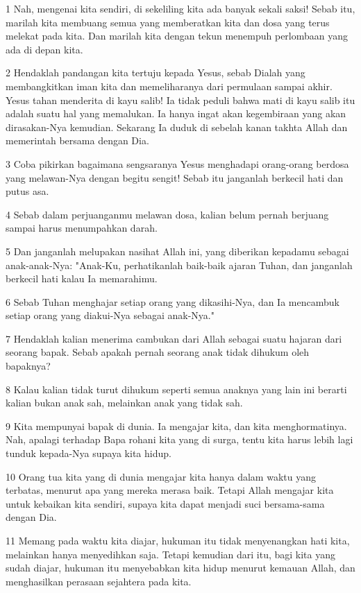 \par 1 Nah, mengenai kita sendiri, di sekeliling kita ada banyak sekali saksi! Sebab itu, marilah kita membuang semua yang memberatkan kita dan dosa yang terus melekat pada kita. Dan marilah kita dengan tekun menempuh perlombaan yang ada di depan kita.
\par 2 Hendaklah pandangan kita tertuju kepada Yesus, sebab Dialah yang membangkitkan iman kita dan memeliharanya dari permulaan sampai akhir. Yesus tahan menderita di kayu salib! Ia tidak peduli bahwa mati di kayu salib itu adalah suatu hal yang memalukan. Ia hanya ingat akan kegembiraan yang akan dirasakan-Nya kemudian. Sekarang Ia duduk di sebelah kanan takhta Allah dan memerintah bersama dengan Dia.
\par 3 Coba pikirkan bagaimana sengsaranya Yesus menghadapi orang-orang berdosa yang melawan-Nya dengan begitu sengit! Sebab itu janganlah berkecil hati dan putus asa.
\par 4 Sebab dalam perjuanganmu melawan dosa, kalian belum pernah berjuang sampai harus menumpahkan darah.
\par 5 Dan janganlah melupakan nasihat Allah ini, yang diberikan kepadamu sebagai anak-anak-Nya: "Anak-Ku, perhatikanlah baik-baik ajaran Tuhan, dan janganlah berkecil hati kalau Ia memarahimu.
\par 6 Sebab Tuhan menghajar setiap orang yang dikasihi-Nya, dan Ia mencambuk setiap orang yang diakui-Nya sebagai anak-Nya."
\par 7 Hendaklah kalian menerima cambukan dari Allah sebagai suatu hajaran dari seorang bapak. Sebab apakah pernah seorang anak tidak dihukum oleh bapaknya?
\par 8 Kalau kalian tidak turut dihukum seperti semua anaknya yang lain ini berarti kalian bukan anak sah, melainkan anak yang tidak sah.
\par 9 Kita mempunyai bapak di dunia. Ia mengajar kita, dan kita menghormatinya. Nah, apalagi terhadap Bapa rohani kita yang di surga, tentu kita harus lebih lagi tunduk kepada-Nya supaya kita hidup.
\par 10 Orang tua kita yang di dunia mengajar kita hanya dalam waktu yang terbatas, menurut apa yang mereka merasa baik. Tetapi Allah mengajar kita untuk kebaikan kita sendiri, supaya kita dapat menjadi suci bersama-sama dengan Dia.
\par 11 Memang pada waktu kita diajar, hukuman itu tidak menyenangkan hati kita, melainkan hanya menyedihkan saja. Tetapi kemudian dari itu, bagi kita yang sudah diajar, hukuman itu menyebabkan kita hidup menurut kemauan Allah, dan menghasilkan perasaan sejahtera pada kita.
